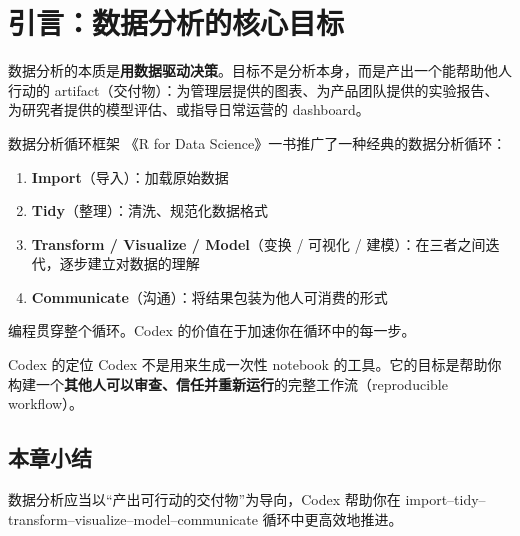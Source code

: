 \section{引言：数据分析的核心目标}

数据分析的本质是\textbf{用数据驱动决策}。目标不是分析本身，而是产出一个能帮助他人行动的 artifact（交付物）：为管理层提供的图表、为产品团队提供的实验报告、为研究者提供的模型评估、或指导日常运营的 dashboard。

\begin{knowledgebox}{数据分析循环框架}
《R for Data Science》一书推广了一种经典的数据分析循环：
\begin{enumerate}[nosep]
    \item \textbf{Import}（导入）：加载原始数据
    \item \textbf{Tidy}（整理）：清洗、规范化数据格式
    \item \textbf{Transform / Visualize / Model}（变换 / 可视化 / 建模）：在三者之间迭代，逐步建立对数据的理解
    \item \textbf{Communicate}（沟通）：将结果包装为他人可消费的形式
\end{enumerate}
编程贯穿整个循环。Codex 的价值在于加速你在循环中的每一步。
\end{knowledgebox}

\begin{importantbox}{Codex 的定位}
Codex 不是用来生成一次性 notebook 的工具。它的目标是帮助你构建一个\textbf{其他人可以审查、信任并重新运行}的完整工作流（reproducible workflow）。
\end{importantbox}

\subsection{本章小结}
数据分析应当以``产出可行动的交付物''为导向，Codex 帮助你在 import--tidy--transform--visualize--model--communicate 循环中更高效地推进。

